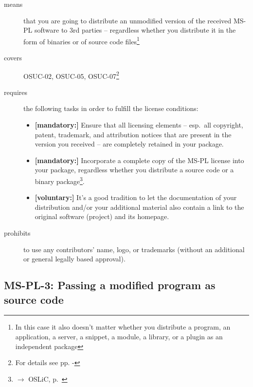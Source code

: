 \begin{description}
\item[means] that you are going to distribute an unmodified version of the
received MS-PL software to 3rd parties -- regardless whether you distribute it
in the form of binaries or of source code files\footnote{In this case it also
doesn't matter whether you distribute a program, an application, a server, a
snippet, a module, a library, or a plugin as an independent package}

\item[covers] OSUC-02, OSUC-05, OSUC-07\footnote{For details see pp.
\pageref{OSUC-02-DEF} - \pageref{OSUC-07-DEF}}

\item[requires] the following tasks in order to fulfill the license conditions:
\begin{itemize}
  \item \textbf{[mandatory:]} Ensure that all licensing elements -- esp.\ all
  copyright, patent, trademark, and attribution notices that are present in the
  version you received -- are completely retained in your package.
  
  \item \textbf{[mandatory:]} Incorporate a complete copy of the MS-PL license
  into your package, regardless whether you distribute a source code or a binary
  package\footnote{$\rightarrow$ OSLiC, p.\ \pageref{MsplSourceBinHint}}.
  
  \item \textbf{[voluntary:]} It's a good tradition to let the documentation of
  your distribution and/or your additional material also contain a link to the
  original software (project) and its homepage.
\end{itemize}

\item[prohibits] to use any contributors' name, logo, or trademarks (without an
additional or general legally based approval).

\end{description}

\subsection{MS-PL-3: Passing a modified program as source code}
\label{OSUC-04-MS-PL}

